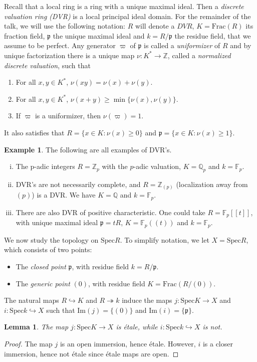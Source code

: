 \documentclass{article}
\newcommand{\Spec}{\mathrm{Spec}}
\newcommand{\Frac}{\mathrm{Frac}}
\newcommand{\FF}{\mathbb{F}}
\newcommand{\QQ}{\mathbb{Q}}
\newcommand{\ZZ}{\mathbb{Z}}
\newcommand{\pp}{\mathfrak{p}}
\theoremstyle{plain}
\newtheorem{lemma}[theorem]{Lemma}
\theoremstyle{definition}
\newtheorem{example}[theorem]{Example}
\begin{document}
    Recall that a local ring is a ring with a unique maximal ideal. Then a \textit{discrete valuation ring (DVR)} is a local principal ideal domain. For the remainder of the talk, we will use the following notation: $R$ will denote a $DVR$, $K=\mathrm{Frac}(R)$ its fraction field, $\pp$ the unique maximal ideal and $k=R/\pp$ the residue field, that we assume to be perfect. Any generator $\varpi$ of $\pp$ is called a \textit{uniformizer} of $R$ and by unique factorization there is a unique map $\nu:K^*\to\ZZ$, called a \textit{normalized discrete valuation}, such that 
    \begin{enumerate}[(1)]
        \item For all $x,y\in K^*$, $\nu(xy)=\nu(x)+\nu(y)$.
        \item For all $x,y\in K^*$, $\nu(x+y)\geq\min\{\nu(x),\nu(y)\}$.
        \item If $\varpi$ is a uniformizer, then $\nu(\varpi)=1$.
    \end{enumerate}
    It also satisfies that $R=\{x\in K:\nu(x)\geq 0\}$ and $\pp=\{x\in K:\nu(x)\geq 1\}$. 
    \begin{example}
        The following are all examples of DVR's.
        \begin{enumerate}[(i)]
            \item The p-adic integers $R=\ZZ_p$ with the $p$-adic valuation, $K=\QQ_p$ and $k=\FF_p$.
            \item DVR's are not necessarily complete, and $R=\ZZ_{(p)}$ (localization away from $(p)$) is a DVR. We have $K=\QQ$ and $k=\FF_p$.
            \item There are also DVR of positive characteristic. One could take $R=\FF_p[[t]]$, with unique maximal ideal $\pp=tR$, $K=\FF_p((t))$ and $k=\FF_p$.
        \end{enumerate}
    \end{example}

    We now study the topology on $\Spec R$. To simplify notation, we let $X=\Spec R$, which consists of two points:
    \begin{itemize}
        \item The \textit{closed point} $\pp$, with residue field $k=R/\pp$.
        \item The \textit{generic point} $(0)$, with residue field $K=\Frac(R/(0))$.
    \end{itemize}
    The natural maps $R\hookrightarrow K$ and $R\twoheadrightarrow k$ induce the maps $j:\Spec K\to X$ and $i:\Spec k\hookrightarrow X$ such that $\mathrm{Im}(j)=\{(0)\}$ and $\mathrm{Im}(i)=\{\pp\}$.
    \begin{lemma}
        The map $j:\Spec K\to X$ is \'{e}tale, while $i:\Spec k\hookrightarrow X$ is not.
    \end{lemma}
    \begin{proof}
        The map $j$ is an open immersion, hence \'{e}tale. However, $i$ is a closer immersion, hence not \'{e}tale since \'{e}tale maps are open.
    \end{proof}
\end{document}
